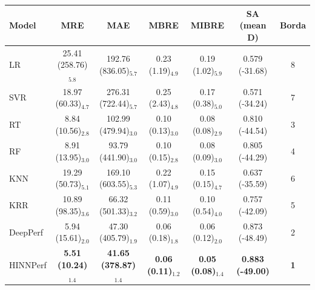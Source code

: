 \begin{tabular}{lcccccc}
\toprule
Model & MRE & MAE & MBRE & MIBRE & SA (mean D) & Borda \\
\midrule
LR & 25.41 (258.76)$_{5.8}$ & 192.76 (836.05)$_{5.7}$ & 0.23 (1.19)$_{4.9}$ & 0.19 (1.02)$_{5.9}$ & 0.579 (-31.68) & 8 \\
SVR & 18.97 (60.33)$_{4.7}$ & 276.31 (722.44)$_{5.7}$ & 0.25 (2.43)$_{4.8}$ & 0.17 (0.38)$_{5.0}$ & 0.571 (-34.24) & 7 \\
RT & 8.84 (10.56)$_{2.8}$ & 102.99 (479.94)$_{3.0}$ & 0.10 (0.13)$_{3.0}$ & 0.08 (0.08)$_{2.9}$ & 0.810 (-44.54) & 3 \\
RF & 8.91 (13.95)$_{3.0}$ & 93.79 (441.90)$_{3.0}$ & 0.10 (0.15)$_{2.8}$ & 0.08 (0.09)$_{3.0}$ & 0.805 (-44.29) & 4 \\
KNN & 19.29 (50.73)$_{5.1}$ & 169.10 (603.55)$_{5.3}$ & 0.22 (1.07)$_{4.9}$ & 0.15 (0.15)$_{4.7}$ & 0.637 (-35.59) & 6 \\
KRR & 10.89 (98.35)$_{3.6}$ & 66.32 (501.33)$_{3.2}$ & 0.11 (0.59)$_{3.0}$ & 0.10 (0.54)$_{4.0}$ & 0.757 (-42.09) & 5 \\
DeepPerf & 5.94 (15.61)$_{2.0}$ & 47.30 (405.79)$_{1.9}$ & 0.06 (0.18)$_{1.8}$ & 0.06 (0.12)$_{2.0}$ & 0.873 (-48.49) & 2 \\
HINNPerf & \textbf{5.51 (10.24)$_{1.4}$} & \textbf{41.65 (378.87)$_{1.4}$} & \textbf{0.06 (0.11)$_{1.2}$} & \textbf{0.05 (0.08)$_{1.4}$} & \textbf{0.883 (-49.00)} & \textbf{1} \\
\bottomrule
\end{tabular}
